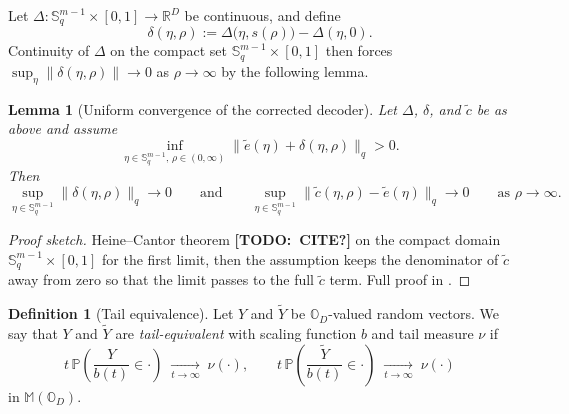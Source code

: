 \documentclass{article}
\newtheorem{lemma}[theorem]{Lemma}
\theoremstyle{definition}
\newtheorem{definition}[theorem]{Definition}
\newcommand{\todo}[1]{{\color{red}\textbf{[TODO:~#1]}}}
\begin{document}
Let \(\Delta:\mathbb{S}^{m-1}_{q}\times[0,1]\to\mathbb{R}^D\) be continuous, and define
\[
\delta(\eta,\rho):=\Delta\bigl(\eta,s(\rho)\bigr)-\Delta(\eta,0).
\]
Continuity of \(\Delta\) on the compact set \(\mathbb{S}^{m-1}_{q}\times[0,1]\) then forces \(\sup_\eta\|\delta(\eta,\rho)\|\to 0\) as \(\rho\to\infty\) by the following lemma.

\begin{lemma}[Uniform convergence of the corrected decoder]
\label{lem:uniform-angular-convergence}
Let \(\Delta\), \(\delta\), and \(\tilde c\) be as above and assume
\[
\inf_{\eta\in\mathbb{S}^{m-1}_{q},\,\rho\in(0,\infty)}
\bigl\|\tilde e(\eta)+\delta(\eta,\rho)\bigr\|_{q}>0.
\]
Then
\[
\sup_{\eta\in\mathbb{S}^{m-1}_{q}}\|\delta(\eta,\rho)\|_q\to 0
\qquad\text{and}\qquad
\sup_{\eta\in\mathbb{S}^{m-1}_{q}}
\bigl\|\tilde c(\eta,\rho)-\tilde e(\eta)\bigr\|_q\to 0
\qquad\text{as }\rho\to\infty.
\]
\end{lemma}

\begin{proof}[Proof sketch]
Heine--Cantor theorem \todo{CITE?} on the compact domain \(\mathbb{S}^{m-1}_{q}\times[0,1]\) for the first limit, then the assumption keeps the denominator of \(\tilde c\) away from zero so that the limit passes to the full \(\tilde c\) term. Full proof in .
\end{proof}


\begin{definition}[Tail equivalence]
\label{def:tail-equivalence}
Let \(Y\) and \(\widetilde Y\) be \(\mathbb{O}_D\)-valued random vectors.
We say that \(Y\) and \(\widetilde Y\) are \emph{tail-equivalent} with
scaling function \(b\) and tail measure \(\nu\) if
\[
t\,\mathbb{P}\!\left(\frac{Y}{b(t)}\in\cdot\right)
\;\xrightarrow[t\to\infty]{}\;\nu(\cdot),
\qquad
t\,\mathbb{P}\!\left(\frac{\widetilde Y}{b(t)}\in\cdot\right)
\;\xrightarrow[t\to\infty]{}\;\nu(\cdot)
\]
in \(\mathbb{M}(\mathbb{O}_D)\).
\end{definition}
\end{document}
